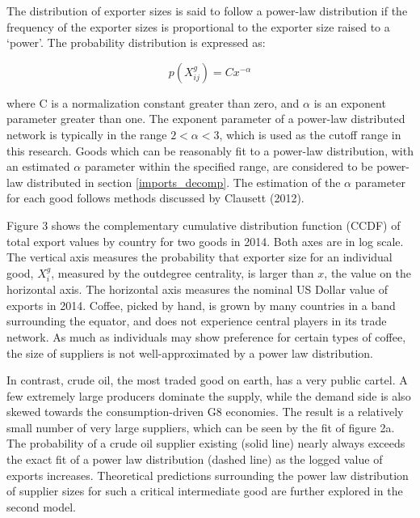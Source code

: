 \documentclass[10pt,letterpaper,pdftex]{article}
\begin{document}
The distribution of exporter sizes is said to follow a power-law distribution if the frequency of the exporter sizes is proportional to the exporter size raised to a `power'. The probability distribution is expressed as:

\begin{equation}
p(X^g_{ij}) = Cx^{-\alpha}
\end{equation}

where C is a normalization constant greater than zero, and $\alpha$ is an exponent parameter greater than one. The exponent parameter of a power-law distributed network is typically in the range $2 < \alpha < 3$, which is used as the cutoff range in this research. Goods which can be reasonably fit to a power-law distribution, with an estimated $\alpha$ parameter within the specified range, are considered to be power-law distributed in section \ref{imports_decomp}. The estimation of the $\alpha$ parameter for each good follows methods discussed by Clausett (2012).

Figure 3 shows the complementary cumulative distribution function (CCDF) of total export values by country for two goods in 2014. Both axes are in log scale. The vertical axis measures the probability that exporter size for an individual good, $X^g_{i}$, measured by the outdegree centrality, is larger than $x$, the value on the horizontal axis. The horizontal axis measures the nominal US Dollar value of exports in 2014. Coffee, picked by hand, is grown by many countries in a band surrounding the equator, and does not experience central players in its trade network. As much as individuals may show preference for certain types of coffee, the size of suppliers is not well-approximated by a power law distribution. 

In contrast, crude oil, the most traded good on earth, has a very public cartel. A few extremely large producers dominate the supply, while the demand side is also skewed towards the consumption-driven G8 economies. The result is a relatively small number of very large suppliers, which can be seen by the fit of figure 2a. The probability of a crude oil supplier existing (solid line) nearly always exceeds the exact fit of a power law distribution (dashed line) as the logged value of exports increases. Theoretical predictions surrounding the power law distribution of supplier sizes for such a critical intermediate good are further explored in the second model. 
\end{document}
